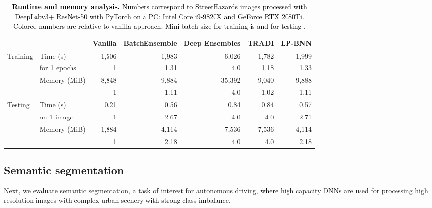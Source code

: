 \documentclass[10pt,twocolumn,letterpaper]{article}
\newcommand{\relative}[1]{\textcolor{myteal}{#1}}
\newcommand{\ab}[1]{\textcolor{black}{#1}}
\begin{document}
 \begin{table}[t!]
\renewcommand{\figurename}{Table}
\renewcommand{\captionfont}{\small}
\centering
 \scalebox{0.6}
 {
\begin{tabular}{l l | r r r r r}
\toprule
  &     & Vanilla & BatchEnsemble      & Deep Ensembles  & TRADI    & LP-BNN     \\
\midrule
\multirow{4}{*}{Training}&  Time (s)  &  1,506    & 1,983    & 6,026  & 1,782  & 1,999     \\
  &  for 1 epochs  &   \relative{1}   &  \relative{1.31}   &  \relative{4.0} &  \relative{1.18} &  \relative{1.33}       \\
  & Memory (MiB) &   8,848 & 9,884 & 35,392   &9,040  & 9,888  \\
  & &   \relative{1}   &  \relative{1.11}   &  \relative{4.0}  &  \relative{1.02}&  \relative{1.11}     \\
\midrule
\multirow{4}{*}{Testing} & Time (s) &  0.21   & 0.56   & 0.84 & 0.84   & 0.57     \\
  & on 1 image  &  \relative{1}  & \relative{2.67}   & \relative{4.0} & \relative{4.0} &  \relative{2.71}    \\ 
  &  Memory (MiB) &  1,884 & 4,114 & 7,536 & 7,536    & 4,114     \\
  &  & \relative{1}   &  \relative{2.18}  & \relative{4.0}  & \relative{4.0} &   \relative{2.18}     \\
\bottomrule
\end{tabular}
}
\vspace{-1mm}
\caption{\ab{\textbf{Runtime and memory analysis.} Numbers correspond to StreetHazards images processed with DeepLabv3+ ResNet-50 with PyTorch on a PC: Intel Core i9-9820X and  GeForce RTX 2080Ti. Colored numbers are relative to vanilla approach. Mini-batch size for training is  and for testing .}
}
\vspace{-6mm}
\label{table:time}
\end{table}

\subsection{Semantic segmentation}

Next, we evaluate semantic segmentation, a task of interest for autonomous driving, 
\ab{where} high capacity DNNs are used for processing high resolution images with complex urban scenery \ab{with strong class imbalance.}
\end{document}
